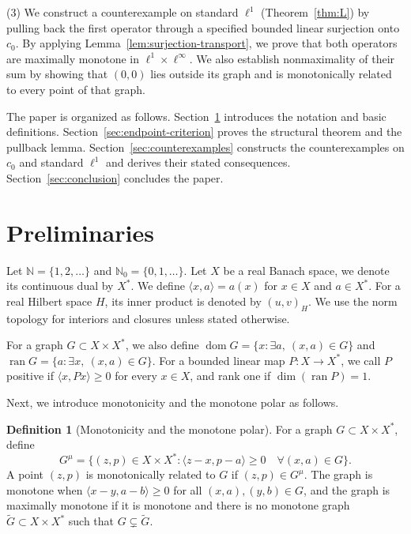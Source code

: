 \documentclass[11pt]{article}
\newcommand{\N}{\mathbb N}
\newcommand{\dom}{\operatorname{dom}}
\newcommand{\pair}[2]{\langle #1,#2\rangle}
\theoremstyle{definition}
\newtheorem{definition}{Definition}
\theoremstyle{remark}
\begin{document}
(3) We construct a counterexample on standard $\ell^1$ (Theorem~\ref{thm:L}) by pulling back the first operator through a specified bounded linear surjection onto $c_0$. By applying Lemma~\ref{lem:surjection-transport}, we prove that both operators are maximally monotone in $\ell^1\times\ell^\infty$. We also establish nonmaximality of their sum by showing that $(0,0)$ lies outside its graph and is monotonically related to every point of that graph. 

The paper is organized as follows. Section~\ref{sec:definitions} introduces the notation and basic definitions. Section~\ref{sec:endpoint-criterion} proves the structural theorem and the pullback lemma. Section~\ref{sec:counterexamples} constructs the counterexamples on $c_0$ and standard $\ell^1$ and derives their stated consequences. Section~\ref{sec:conclusion} concludes the paper. 


\section{Preliminaries}
\label{sec:definitions}
Let $\N=\{1,2,\ldots\}$ and $\N_0=\{0,1,\ldots\}$. Let $X$ be a real Banach space, we denote its continuous dual by $X^*$. We define $\pair{x}{a}=a(x)$ for $x\in X$ and $a\in X^*$. For a real Hilbert space $H$, its inner product is denoted by $(u,v)_H$. We use the norm topology for interiors and closures unless stated otherwise. 

For a graph $G\subset X\times X^*$, we also define $\dom G=\{x:\exists a,\ (x,a)\in G\}$ and $\operatorname{ran}G=\{a:\exists x,\ (x,a)\in G\}$. 
For a bounded linear map $P:X\to X^*$, we call $P$ positive if $\pair{x}{Px}\ge0$ for every $x\in X$, and rank one if $\dim(\operatorname{ran}P)=1$. 

Next, we introduce monotonicity and the monotone polar  \cite{martinezsvaiter2005,bauschkemclarensendov2006} as follows. 

\begin{definition}[Monotonicity and the monotone polar]
\label{D1}
For a graph $G\subset X\times X^*$, define
\begin{equation}
G^\mu=\{(z,p)\in X\times X^*:
 \pair{z-x}{p-a}\ge0\quad\forall(x,a)\in G\}.
\label{eq:D1}
\end{equation}
A point $(z,p)$ is monotonically related to $G$ if $(z,p)\in G^\mu$.
The graph is monotone when $\pair{x-y}{a-b}\ge0$ for all $(x,a),(y,b)\in G$, and the graph is maximally monotone if it is monotone and there is no monotone graph $\widetilde G\subset X\times X^*$ such that $G\subsetneq\widetilde G$. 
\end{definition}
\end{document}
